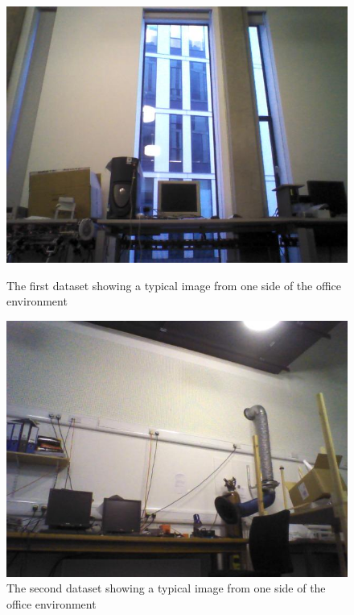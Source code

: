 \documentclass[11pt]{report}
\begin{document}
\begin{figure}[h!]
\begin{minipage}[b]{0.5\linewidth}
\includegraphics[scale=0.4]{../Drawings/datasetImages/dataset5.jpg}
\caption{The first dataset showing a typical image from one side of the office environment}
\label{fig:dataset5}
\end{minipage}
\hspace{0.5cm}
\begin{minipage}[b]{0.5\linewidth}
\includegraphics[scale=0.4]{../Drawings/datasetImages/dataset6.jpg}
\caption{The second dataset showing a typical image from one side of the office environment}
\label{fig:dataset6}
\end{minipage}
\end{figure}
\end{document}
